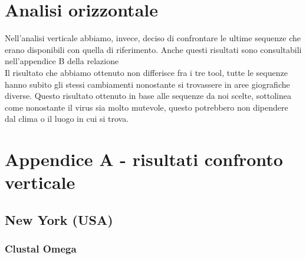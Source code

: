 \documentclass[a4paper,10pt]{article}
\begin{document}
\section{Analisi orizzontale}
Nell'analisi verticale abbiamo, invece, deciso di confrontare le ultime sequenze che erano disponibili con quella di riferimento. Anche questi risultati sono consultabili nell'appendice B della relazione\\
Il risultato che abbiamo ottenuto  non differisce fra i tre tool, tutte le sequenze hanno subito gli stessi cambiamenti nonostante si trovassere in aree giografiche diverse. Questo risultato ottenuto in base alle sequenze da noi scelte, sottolinea come nonostante il virus sia molto mutevole, questo potrebbero non dipendere dal clima o il luogo in cui si trova.


\newpage

\section{Appendice A - risultati confronto verticale}


\subsection{New York (USA)}
\subsubsection{Clustal Omega}
\end{document}

